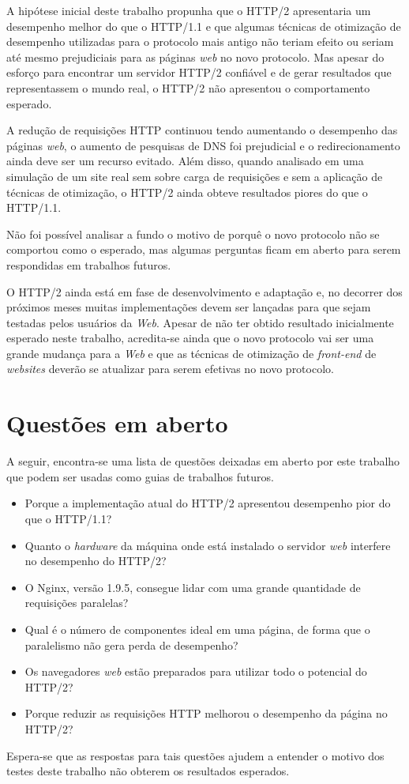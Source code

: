 A hipótese inicial deste trabalho propunha que o HTTP/2 apresentaria um desempenho melhor do que o HTTP/1.1 e que algumas técnicas de otimização de desempenho utilizadas para o protocolo mais antigo não teriam efeito ou seriam até mesmo prejudiciais para as páginas \textit{web} no novo protocolo. Mas apesar do esforço para encontrar um servidor HTTP/2 confiável e de gerar resultados que representassem o mundo real, o HTTP/2 não apresentou o comportamento esperado.

A redução de requisições HTTP continuou tendo aumentando o desempenho das páginas \textit{web}, o aumento de pesquisas de DNS foi prejudicial e o redirecionamento ainda deve ser um recurso evitado. Além disso, quando analisado em uma simulação de um site real sem sobre carga de requisições e sem a aplicação de técnicas de otimização, o HTTP/2 ainda obteve resultados piores do que o HTTP/1.1.

Não foi possível analisar a fundo o motivo de porquê o novo protocolo não se comportou como o esperado, mas algumas perguntas ficam em aberto para serem respondidas em trabalhos futuros.

O HTTP/2 ainda está em fase de desenvolvimento e adaptação e, no decorrer dos próximos meses muitas implementações devem ser lançadas para que sejam testadas pelos usuários da \textit{Web}. Apesar de não ter obtido resultado inicialmente esperado neste trabalho, acredita-se ainda que o novo protocolo vai ser uma grande mudança para a \textit{Web} e que as técnicas de otimização de \textit{front-end} de \textit{websites} deverão se atualizar para serem efetivas no novo protocolo.

\section{Questões em aberto}
\label{questoesemaberto}

A seguir, encontra-se uma lista de questões deixadas em aberto por este trabalho que podem ser usadas como guias de trabalhos futuros.

\begin{itemize}
	\item Porque a implementação atual do HTTP/2 apresentou desempenho pior do que o HTTP/1.1?
	\item Quanto o \textit{hardware} da máquina onde está instalado o servidor \textit{web} interfere no desempenho do HTTP/2?
	\item O Nginx, versão 1.9.5, consegue lidar com uma grande quantidade de requisições paralelas?
	\item Qual é o número de componentes ideal em uma página, de forma que o paralelismo não gera perda de desempenho?
	\item Os navegadores \textit{web} estão preparados para utilizar todo o potencial do HTTP/2?
	\item Porque reduzir as requisições HTTP melhorou o desempenho da página no HTTP/2?
\end{itemize}

Espera-se que as respostas para tais questões ajudem a entender o motivo dos testes deste trabalho não obterem os resultados esperados.
